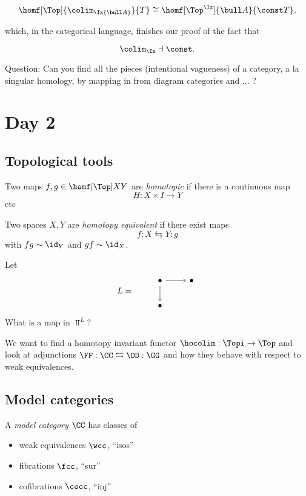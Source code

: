 \documentclass{article}
\begin{document}
$$\homf[\Top]{\colim_\Ix{\bull A}}{T} \cong \homf[\Top^\Ix]{\bull A}{\const T},$$

which, in the categorical language, finishes our proof of the fact that

$$\colim_\Ix \dashv \const.$$

Question:
Can you find all the pieces (intentional vagueness) of a category, a la singular
homology, by mapping in from diagram categories and ... ?

\section{Day 2}
\subsection{Topological tools}
\begin{defn}
 Two maps $f,g\in\homf[\Top] X Y$ are \textit{homotopic} if there is a continuous
 map
 $$H:X\times I\to Y$$
 etc
\end{defn}

\begin{defn}
  Two spaces $X,Y$ are \textit{homotopy equivalent} if there exist maps
  $$f:X\leftrightarrows Y:g$$
  with $fg\sim \id_Y$ and $gf\sim\id_X$.
\end{defn}

\begin{example}
  Let
  $$L=\begin{tikzcd}&\bullet\arrow[r]\arrow[d]&\bullet\\ &\bullet\end{tikzcd}$$
 What is a map in $\Top^L$? 
\end{example}

We want to find a homotopy invariant functor
$\hocolim:\Topi\to\Top$
and look at adjunctions
$\FF:\CC\leftrightarrows\DD:\GG$
and how they behave with respect to weak equivalences.

\subsection{Model categories}
A \textit{model category} $\CC$ has classes of

\begin{itemize}
\item weak equivalences $\wcc$, ``isos''
\item fibrations $\fcc$, ``sur''
\item cofibrations $\cocc$, ``inj''
\end{itemize}
\end{document}
